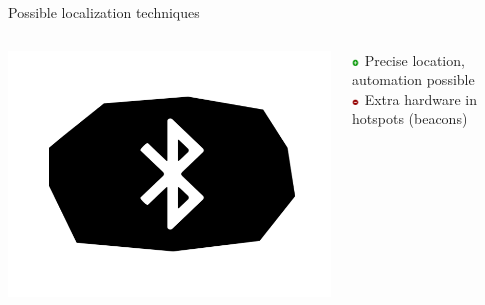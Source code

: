 \documentclass[11pt]{beamer}
\begin{document}
\begin{frame}{Possible localization techniques}
\begin{columns}[c]
    \begin{column}{0.2\textwidth}
      \includegraphics[width=\textwidth]{beacon-symbol}
    \end{column}

    \hfill

    \begin{column}{0.8\textwidth}

      \includegraphics[width=0.05\textwidth]{plus} Precise location, automation possible\\
      \includegraphics[width=0.05\textwidth]{minus} Extra hardware in hotspots (beacons)

    \end{column}

  \end{columns}

  \pause

  \hrulefill

  \begin{columns}[c]


\end{columns}
\end{frame}
\end{document}
